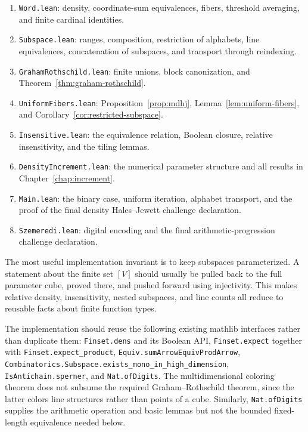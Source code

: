 \begin{enumerate}
\item \texttt{Word.lean}: density, coordinate-sum equivalences, fibers, threshold averaging, and
  finite cardinal identities.
\item \texttt{Subspace.lean}: ranges, composition, restriction of alphabets, line equivalences,
  concatenation of subspaces, and transport through reindexing.
\item \texttt{GrahamRothschild.lean}: finite unions, block canonization, and
  Theorem~\ref{thm:graham-rothschild}.
\item \texttt{UniformFibers.lean}: Proposition~\ref{prop:mdhj},
  Lemma~\ref{lem:uniform-fibers}, and Corollary~\ref{cor:restricted-subspace}.
\item \texttt{Insensitive.lean}: the equivalence relation, Boolean closure, relative
  insensitivity, and the tiling lemmas.
\item \texttt{DensityIncrement.lean}: the numerical parameter structure and all results in
  Chapter~\ref{chap:increment}.
\item \texttt{Main.lean}: the binary case, uniform iteration, alphabet transport, and the proof of
  the final density Hales--Jewett challenge declaration.
\item \texttt{Szemeredi.lean}: digital encoding and the final arithmetic-progression
  challenge declaration.
\end{enumerate}

The most useful implementation invariant is to keep subspaces parameterized.  A statement about
the finite set $[V]$ should usually be pulled back to the full parameter cube, proved there, and
pushed forward using injectivity.  This makes relative density, insensitivity, nested subspaces,
and line counts all reduce to reusable facts about finite function types.

The implementation should reuse the following existing mathlib interfaces rather than duplicate
them: \texttt{Finset.dens} and its Boolean API, \texttt{Finset.expect} together with
\texttt{Finset.expect\_product}, \texttt{Equiv.sumArrowEquivProdArrow},
\texttt{Combinatorics.Subspace.exists\_mono\_in\_high\_dimension},
\texttt{IsAntichain.sperner}, and \texttt{Nat.ofDigits}.  The multidimensional coloring theorem
does not subsume the required Graham--Rothschild theorem, since the latter colors line structures
rather than points of a cube.  Similarly, \texttt{Nat.ofDigits} supplies the arithmetic operation
and basic lemmas but not the bounded fixed-length equivalence needed below.

